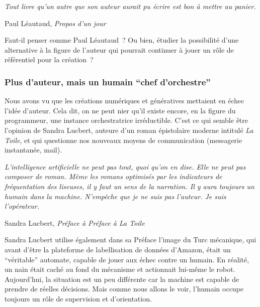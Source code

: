 \documentclass{article}
\newenvironment{citationbox}
{\begin{center}
		\begin{minipage}{.8\textwidth}
		}
		{
		\end{minipage}	
\end{center}
}
\begin{document}
					\begin{citationbox}
						\textit{Tout livre qu'un autre que son auteur aurait pu écrire est bon à mettre au panier.}
						\begin{flushright}
							Paul Léautaud, \textit{Propos d'un jour}
						\end{flushright}
					\end{citationbox}
					Faut-il penser comme Paul Léautaud~? Ou bien, étudier la possibilité d'une alternative à la figure de l'auteur qui pourrait continuer à jouer un rôle de référentiel pour la création~?
			

			\subsubsection{Plus d'auteur, mais un humain ``chef d'orchestre''}
				Nous avons vu que les créations numériques et génératives mettaient en échec l'idée d'auteur. Cela dit, on ne peut nier qu'il existe encore, en la figure du programmeur, une instance orchestratrice irréductible. C'est ce qui semble être l'opinion de Sandra Lucbert, auteure d'un roman épistolaire moderne intitulé \textit{La Toile}, et qui questionne nos nouveaux moyens de communication (messagerie instantanée, mail).
				\begin{citationbox}
					\textit{L’intelligence	artificielle	ne	peut	pas	tout,	quoi	qu’on	en	dise.
						Elle	 ne	 peut	 pas	 composer	 de	 roman.	 Même	 les	 romans	 optimisés	 par	 les
						indicateurs	 de	 fréquentation	 des	 liseuses,	 il	 y	 faut	 un	 sens	 de	 la	 narration.	 Il	 y
						aura	toujours	un	humain	dans	la	machine.	N’empêche	que	je	ne	suis	pas	l’auteur.
						Je	 suis	 l’opérateur.}	
					\begin{flushright}
						Sandra Lucbert, \textit{Préface à Préface à La Toile}
					\end{flushright}
				\end{citationbox}
				Sandra Lucbert utilise également dans sa Préface l'image du Turc mécanique, qui avant d'être la plateforme de labellisation de données d'Amazon, était un ``véritable'' automate, capable de jouer aux échec contre un humain. En réalité, un nain était caché au fond du mécanisme et actionnait lui-même le robot. Aujourd'hui, la situation est un peu différente car la machine est capable de prendre de réelles décisions. Mais comme nous allons le voir, l'humain occupe toujours un rôle de supervision et d'orientation.\\
				
\end{document}

